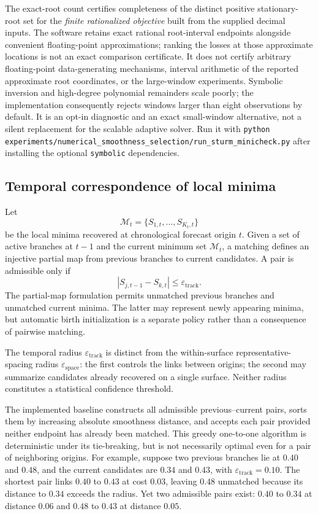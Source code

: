 \documentclass[english]{smcca}
\begin{document}
The exact-root count certifies completeness of the distinct
positive stationary-root set for the \emph{finite rationalized
objective} built from the supplied decimal inputs. The software
retains exact rational root-interval endpoints alongside convenient
floating-point approximations; ranking the losses at those
approximate locations is not an exact comparison certificate. It does not certify arbitrary floating-point
data-generating mechanisms, interval arithmetic of the
reported approximate root coordinates, or the large-window
experiments. Symbolic inversion and high-degree polynomial
remainders scale poorly; the implementation consequently
rejects windows larger than eight observations by default.
It is an opt-in diagnostic and an exact small-window
alternative, not a silent replacement for the scalable
adaptive solver. Run it with
\texttt{python experiments/numerical\_smoothness\_selection/run\_sturm\_minicheck.py}
after installing the optional \texttt{symbolic} dependencies.

\subsection{Temporal correspondence of local minima}
\label{sec:tracking}

Let
\[
\mathcal M_t=\{S_{1,t},\ldots,S_{K_t,t}\}
\]
be the local minima recovered at chronological forecast origin $t$.
Given a set of active branches at $t-1$ and the current minimum set
$\mathcal M_t$, a matching defines an injective partial map from previous
branches to current candidates. A pair is admissible only if
\begin{equation}
\label{eq:track_epsilon}
|S_{j,t-1}-S_{k,t}|\le\varepsilon_{\mathrm{track}}.
\end{equation}
The partial-map formulation permits unmatched previous branches and
unmatched current minima. The latter may represent newly appearing
minima, but automatic birth initialization is a separate policy rather than
a consequence of pairwise matching.

The temporal radius $\varepsilon_{\mathrm{track}}$ is distinct from the
within-surface representative-spacing radius $\varepsilon_{\mathrm{space}}$:
the first controls the links between origins; the second may summarize
candidates already recovered on a single surface. Neither radius
constitutes a statistical confidence threshold.

The implemented baseline constructs all admissible previous--current
pairs, sorts them by increasing absolute smoothness distance, and
accepts each pair provided neither endpoint has already been matched.
This greedy one-to-one algorithm is deterministic under its tie-breaking,
but is not necessarily optimal even for a pair of neighboring origins.
For example, suppose two previous branches lie at $0.40$ and $0.48$,
and the current candidates are $0.34$ and $0.43$, with
$\varepsilon_{\mathrm{track}}=0.10$. The shortest pair links $0.40$ to
$0.43$ at cost $0.03$, leaving $0.48$ unmatched because its distance to
$0.34$ exceeds the radius. Yet two admissible pairs exist: $0.40$
to $0.34$ at distance $0.06$ and $0.48$ to $0.43$ at distance $0.05$.
\end{document}
